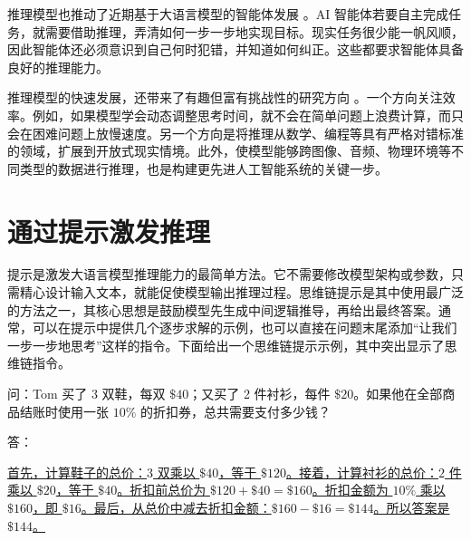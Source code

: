 推理模型也推动了近期基于大语言模型的智能体发展 \cite{yao-etal:2023react,wang-etal:2024survey}。AI 智能体若要自主完成任务，就需要借助推理，弄清如何一步一步地实现目标。现实任务很少能一帆风顺，因此智能体还必须意识到自己何时犯错，并知道如何纠正。这些都要求智能体具备良好的推理能力。

推理模型的快速发展，还带来了有趣但富有挑战性的研究方向 \cite{li-etal:2025system,chen-etal:2026towards}。一个方向关注效率。例如，如果模型学会动态调整思考时间，就不会在简单问题上浪费计算，而只会在困难问题上放慢速度。另一个方向是将推理从数学、编程等具有严格对错标准的领域，扩展到开放式现实情境。此外，使模型能够跨图像、音频、物理环境等不同类型的数据进行推理，也是构建更先进人工智能系统的关键一步。


\section{通过提示激发推理}

提示是激发大语言模型推理能力的最简单方法。它不需要修改模型架构或参数，只需精心设计输入文本，就能促使模型输出推理过程。思维链提示是其中使用最广泛的方法之一，其核心思想是鼓励模型先生成中间逻辑推导，再给出最终答案。通常，可以在提示中提供几个逐步求解的示例，也可以直接在问题末尾添加“让我们一步一步地思考”这样的指令。下面给出一个思维链提示示例，其中突出显示了思维链指令。

\vspace{0.5em}
\begin{tcolorbox}

\begingroup
\setlength{\leftskip}{2em}
\setlength{\rightskip}{2em}

问：Tom 买了 3 双鞋，每双 $\$40$；又买了 2 件衬衫，每件 $\$20$。如果他在全部商品结账时使用一张 $10\%$ 的折扣券，总共需要支付多少钱？

\vspace{0.3em}

答：

\vspace{0.3em}

\uline{首先，计算鞋子的总价：$3$ 双乘以 $\$40$，等于 $\$120$。接着，计算衬衫的总价：$2$ 件乘以 $\$20$，等于 $\$40$。折扣前总价为 $\$120 + \$40 = \$160$。折扣金额为 $10\%$ 乘以 $\$160$，即 $\$16$。最后，从总价中减去折扣金额：$\$160 - \$16 = \$144$。所以答案是 $\$144$。}

\endgroup

\end{tcolorbox}
\vspace{0.5em}

